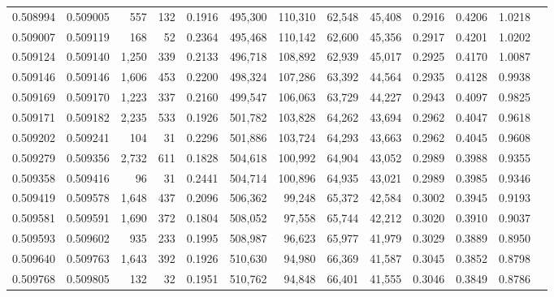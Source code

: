 \begin{tabular}{rrrrrrrrrrrrr}
0.508994 & 0.509005 &   557 &   132 &                                     0.1916 & 495,300 & 110,310 &  62,548 &  45,408 & 0.2916 & 0.4206 & 1.0218 \\
0.509007 & 0.509119 &   168 &    52 &                                     0.2364 & 495,468 & 110,142 &  62,600 &  45,356 & 0.2917 & 0.4201 & 1.0202 \\
0.509124 & 0.509140 & 1,250 &   339 &                                     0.2133 & 496,718 & 108,892 &  62,939 &  45,017 & 0.2925 & 0.4170 & 1.0087 \\
0.509146 & 0.509146 & 1,606 &   453 &                                     0.2200 & 498,324 & 107,286 &  63,392 &  44,564 & 0.2935 & 0.4128 & 0.9938 \\
0.509169 & 0.509170 & 1,223 &   337 &                                     0.2160 & 499,547 & 106,063 &  63,729 &  44,227 & 0.2943 & 0.4097 & 0.9825 \\
0.509171 & 0.509182 & 2,235 &   533 &                                     0.1926 & 501,782 & 103,828 &  64,262 &  43,694 & 0.2962 & 0.4047 & 0.9618 \\
0.509202 & 0.509241 &   104 &    31 &                                     0.2296 & 501,886 & 103,724 &  64,293 &  43,663 & 0.2962 & 0.4045 & 0.9608 \\
0.509279 & 0.509356 & 2,732 &   611 &                                     0.1828 & 504,618 & 100,992 &  64,904 &  43,052 & 0.2989 & 0.3988 & 0.9355 \\
0.509358 & 0.509416 &    96 &    31 &                                     0.2441 & 504,714 & 100,896 &  64,935 &  43,021 & 0.2989 & 0.3985 & 0.9346 \\
0.509419 & 0.509578 & 1,648 &   437 &                                     0.2096 & 506,362 &  99,248 &  65,372 &  42,584 & 0.3002 & 0.3945 & 0.9193 \\
0.509581 & 0.509591 & 1,690 &   372 &                                     0.1804 & 508,052 &  97,558 &  65,744 &  42,212 & 0.3020 & 0.3910 & 0.9037 \\
0.509593 & 0.509602 &   935 &   233 &                                     0.1995 & 508,987 &  96,623 &  65,977 &  41,979 & 0.3029 & 0.3889 & 0.8950 \\
0.509640 & 0.509763 & 1,643 &   392 &                                     0.1926 & 510,630 &  94,980 &  66,369 &  41,587 & 0.3045 & 0.3852 & 0.8798 \\
0.509768 & 0.509805 &   132 &    32 &                                     0.1951 & 510,762 &  94,848 &  66,401 &  41,555 & 0.3046 & 0.3849 & 0.8786 \\

\end{tabular}
